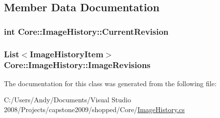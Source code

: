 \subsection{Member Data Documentation}
\hypertarget{class_core_1_1_image_history_a1a695f64608fc10b95bce32634092f3c}{
\subsubsection[{CurrentRevision}]{\setlength{\rightskip}{0pt plus 5cm}int {\bf Core::ImageHistory::CurrentRevision}}}
\label{class_core_1_1_image_history_a1a695f64608fc10b95bce32634092f3c}
\hypertarget{class_core_1_1_image_history_abb81d12e0bcf3f1f0e79c797f38cc6f2}{
\subsubsection[{ImageRevisions}]{\setlength{\rightskip}{0pt plus 5cm}List$<${\bf ImageHistoryItem}$>$ {\bf Core::ImageHistory::ImageRevisions}}}
\label{class_core_1_1_image_history_abb81d12e0bcf3f1f0e79c797f38cc6f2}


The documentation for this class was generated from the following file:\begin{DoxyCompactItemize}
\item 
C:/Users/Andy/Documents/Visual Studio 2008/Projects/capstone2009/shopped/Core/\hyperlink{_image_history_8cs}{ImageHistory.cs}\end{DoxyCompactItemize}
